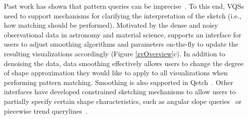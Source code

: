 Past work has shown that pattern queries 
can be imprecise~\cite{correll2016semantics,Holz2009,Eichmann2015}. 
To this end, VQSs need to support mechanisms for 
clarifying the interpretation of the sketch 
(i.e., how matching should be performed). 
Motivated by the dense and noisy observational data 
in astronomy and material science, 
\zvpp supports an interface for users to 
adjust smoothing algorithms and parameters on-the-fly 
to update the resulting visualizations accordingly (Figure \ref{zvOverview}c). 
In addition to denoising the data, 
data smoothing effectively allows users to 
change the degree of shape approximation 
they would like to apply to all visualizations 
when performing pattern matching. 
Smoothing is also supported in Qetch~\cite{Mannino2018}. 
Other interfaces have developed constrained 
sketching mechanisms to allow users to 
partially specify certain shape characteristics, 
such as angular slope queries~\cite{Hochheiser2004} or 
piecewise trend querylines~\cite{ryall2005querylines}. 

